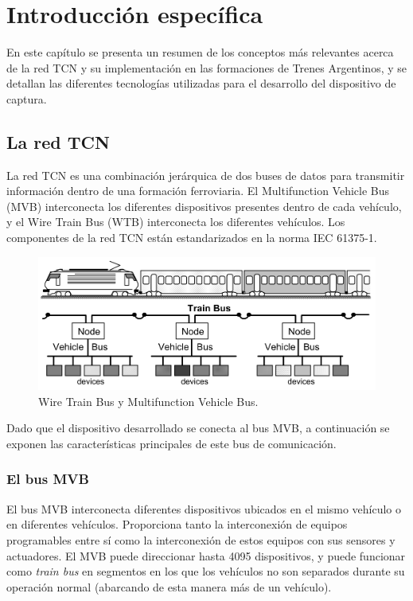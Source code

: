 \chapter{Introducción específica}

En este capítulo se presenta un resumen de los conceptos más relevantes acerca de la red TCN y su implementación en las formaciones de Trenes Argentinos, y se detallan las diferentes tecnologías utilizadas para el desarrollo del dispositivo de captura.

\section{La red TCN}

La red TCN es una combinación jerárquica de dos buses de datos para transmitir información dentro de una formación ferroviaria. El Multifunction Vehicle Bus (MVB) interconecta los diferentes dispositivos presentes dentro de cada vehículo, y el Wire Train Bus (WTB) interconecta los diferentes vehículos. Los componentes de la red TCN están estandarizados en la norma IEC 61375-1.

\begin{figure}[htbp]
	\centering
	\includegraphics[width=.8\textwidth]{./Figures/tcn-mvb-wtb.png}
	\caption[Wire Train Bus y Multifunction Vehicle Bus]{Wire Train Bus y Multifunction Vehicle Bus.
        \\ }
\end{figure}

Dado que el dispositivo desarrollado se conecta al bus MVB, a continuación se exponen las características principales de este bus de comunicación.

\subsection{El bus MVB}

El bus MVB interconecta diferentes dispositivos ubicados en el mismo vehículo o en diferentes vehículos. Proporciona tanto la interconexión de equipos programables entre sí como la interconexión de estos equipos con sus sensores y actuadores. El MVB puede direccionar hasta 4095 dispositivos, y puede funcionar como \textit{train bus} en segmentos en los que los vehículos no son separados durante su operación normal (abarcando de esta manera más de un vehículo).

